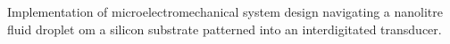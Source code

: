 \documentclass[letterpaper]{deedy-resume}
\begin{document}
\begin{minipage}[t]{0.66\textwidth}
\sectionspace %


\begin{tightitemize}
\item Implementation of microelectromechanical system design navigating a nanolitre fluid droplet om a silicon substrate patterned into an interdigitated transducer.
\end{tightitemize}

\sectionspace %









\sectionspace %


\end{minipage} %
\end{document}
